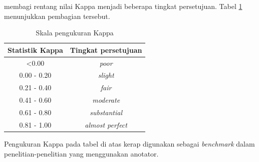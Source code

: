 	\cite{landis1977measurement} membagi rentang nilai Kappa menjadi beberapa tingkat persetujuan. Tabel \ref{table:skalaKappa} menunjukkan pembagian tersebut. 
	\begin{table}
		\centering
		\caption{Skala pengukuran Kappa \citep{landis1977measurement}}
		\label{table:skalaKappa}
		\begin{tabular}{|c|c|}
			\hline
			Statistik Kappa & Tingkat persetujuan \\ \hline
			<0.00 & \textit{poor} \\ \hline
			0.00 - 0.20 & \textit{slight} \\ \hline
			0.21 - 0.40 & \textit{fair} \\ \hline
			0.41 - 0.60 & \textit{moderate} \\ \hline
			0.61 - 0.80 & \textit{substantial} \\ \hline
			0.81 - 1.00 & \textit{almost perfect} \\ \hline
		\end{tabular}
	\end{table}
	\noindent Pengukuran Kappa pada tabel di atas kerap digunakan sebagai \textit{benchmark} dalam penelitian-penelitian yang menggunakan anotator.
	
